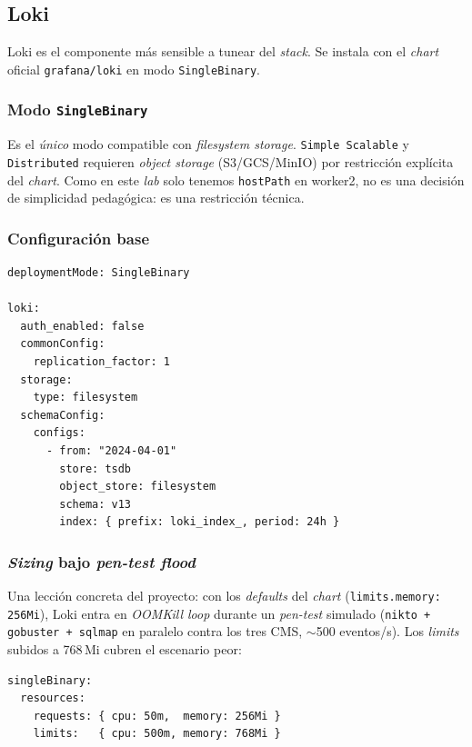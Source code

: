 \subsection{Loki}

Loki es el componente más sensible a tunear del \emph{stack}. Se instala con el \emph{chart} oficial \texttt{grafana/loki} en modo \texttt{SingleBinary}.

\subsubsection{Modo \texttt{SingleBinary}}

Es el \emph{único} modo compatible con \emph{filesystem storage}. \texttt{Simple Scalable} y \texttt{Distributed} requieren \emph{object storage} (S3/GCS/MinIO) por restricción explícita del \emph{chart}. Como en este \emph{lab} solo tenemos \texttt{hostPath} en worker2, no es una decisión de simplicidad pedagógica: es una restricción técnica.

\subsubsection{Configuración base}

\begin{lstlisting}[style=yaml]
deploymentMode: SingleBinary

loki:
  auth_enabled: false
  commonConfig:
    replication_factor: 1
  storage:
    type: filesystem
  schemaConfig:
    configs:
      - from: "2024-04-01"
        store: tsdb
        object_store: filesystem
        schema: v13
        index: { prefix: loki_index_, period: 24h }
\end{lstlisting}

\subsubsection{\emph{Sizing} bajo \emph{pen-test flood}}

Una lección concreta del proyecto: con los \emph{defaults} del \emph{chart} (\texttt{limits.memory: 256Mi}), Loki entra en \emph{OOMKill loop} durante un \emph{pen-test} simulado (\texttt{nikto + gobuster + sqlmap} en paralelo contra los tres CMS, $\sim$500 eventos/s). Los \emph{limits} subidos a 768\,Mi cubren el escenario peor:

\begin{lstlisting}[style=yaml]
singleBinary:
  resources:
    requests: { cpu: 50m,  memory: 256Mi }
    limits:   { cpu: 500m, memory: 768Mi }
\end{lstlisting}

